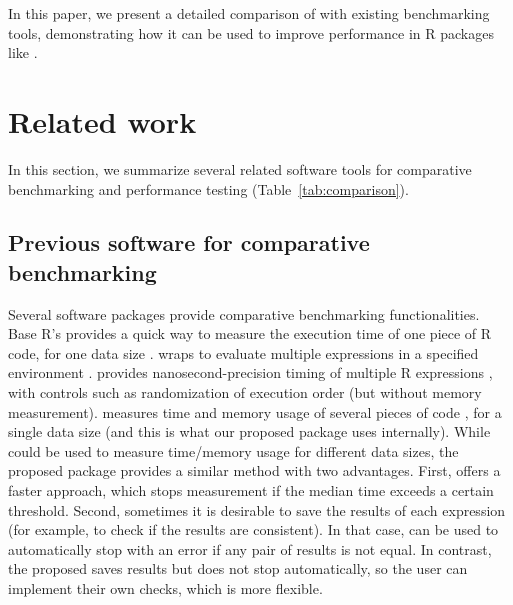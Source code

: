 In this paper, we present a detailed comparison of  with existing benchmarking tools, demonstrating how it can be used to improve performance in R packages like .

\section{Related work}
In this section, we summarize several related software tools for comparative benchmarking and performance testing
(Table~\ref{tab:comparison}).

\subsection{Previous software for comparative benchmarking}

Several software packages provide comparative benchmarking functionalities.
Base R's  provides a quick way to measure the execution time of one piece of R code, for one data size \citep{baseR}. 
 wraps  to evaluate multiple expressions in a specified environment \citep{rbenchmark}.
 provides nanosecond-precision timing of multiple R expressions \citep{microbenchmark}, with controls such as randomization of execution order (but without memory measurement).
 measures time and memory usage of several pieces of code \citep{bench}, for a single data size (and this is what our proposed  package uses internally).
While  could be used to measure time/memory usage for different data sizes, the proposed  package provides a similar method with two advantages.
First,  offers a faster approach, which stops measurement if the median time exceeds a certain threshold. 
Second, sometimes it is desirable to save the results of each expression (for example, to check if the results are consistent).
In that case,  can be used to automatically stop with an error if any pair of results is not equal.
In contrast, the proposed  saves results but does not stop automatically, so the user can implement their own checks, which is more flexible.


